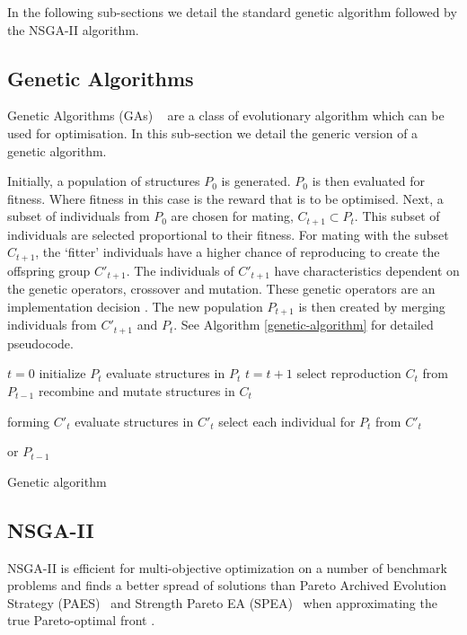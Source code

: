\documentclass[sigconf]{acmart}
\begin{document}
In the following sub-sections we detail the standard genetic algorithm followed by the NSGA-II algorithm.

\subsection{Genetic Algorithms}

Genetic Algorithms (GAs) ~\cite{Holland1975} are a class of evolutionary algorithm which can be used for optimisation. In this sub-section we detail the generic version of a genetic algorithm.

Initially, a population of structures $P_{0}$ is generated. $P_{0}$ is then evaluated for fitness. Where fitness in this case is the reward that is to be optimised. Next, a subset of individuals from $P_{0}$ are chosen for mating, $C_{t+1} \subset P_{t}$. This subset of individuals are selected proportional to their fitness. For mating with the subset $C_{t+1}$, the `fitter' individuals have a higher chance of reproducing to create the offspring group $C'_{t+1}$. The individuals of $C'_{t+1}$ have characteristics dependent on the genetic operators, crossover and mutation. These genetic operators are an implementation decision \cite{FogelDavidB2009}. The new population $P_{t+1}$ is then created by merging individuals from $C'_{t+1}$ and $P_{t}$. See Algorithm \ref{genetic-algorithm} for detailed pseudocode.
%
\begin{algorithm}[t]
\begin{algorithmic}[1]
\State $t=0$
\State initialize $P_{t}$
\State evaluate structures in $P_{t}$
\State $t=t+1$
\State select reproduction $C_{t}$ from $P_{t-1}$
\State recombine and mutate structures in $C_{t}$

forming $C'_{t}$
\State evaluate structures in $C'_{t}$
\State select each individual for $P_{t}$ from $C'_{t}$ 

or $P_{t-1}$
\EndWhile
\caption{Genetic algorithm \cite{FogelDavidB2009}}
\label{genetic-algorithm}
\end{algorithmic}
\end{algorithm}



\subsection{NSGA-II}


NSGA-II is efficient for multi-objective optimization on a number of benchmark problems and finds a better spread of solutions than Pareto Archived Evolution Strategy (PAES)~\cite{Knowles1999} and Strength Pareto EA (SPEA)~\cite{Zitzler2006} when approximating the true Pareto-optimal front \cite{Valkanas2014}.
\end{document}
